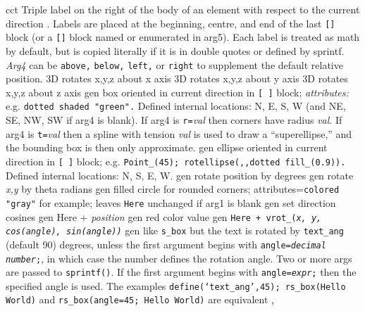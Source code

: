   {cct}%
  {Triple label on the right of the body of an element with respect to the
    current direction .  Labels are placed at the
    beginning, centre, and end of the last {\tt []} block (or a {\tt []} block
    named or enumerated in arg5). Each label is treated as math by
    default, but is copied literally if it is in double quotes or defined
    by sprintf.  {\sl Arg4} can be {\tt above,} {\tt below,} {\tt left,}
    or {\tt right} to supplement the default relative position.}%
%
  {3D} {rotates x,y,z about x axis}%
%
  {3D} {rotates x,y,z about y axis}%
%
  {3D} {rotates x,y,z about z axis}%
%
  {gen}%
  {box oriented in current direction in {\tt [ ]} block;
   {\sl attributes:} e.g. {\tt dotted shaded "green".}  Defined internal
   locations: N, E, S, W (and NE, SE, NW, SW if arg4 is blank).  If arg4
   is {\tt r=}{\sl val} then corners have radius {\sl val}.  If arg4 is
   {\tt t=}{\sl val} then a spline with tension {\sl val} is used to draw
   a ``superellipse,'' and the bounding box is then only approximate. }%
%
  {gen}%
  {ellipse oriented in current direction in {\tt [ ]} block;
   e.g. {\tt Point\_(45); rotellipse(,{},dotted fill\_(0.9)).} Defined
   internal locations: N, S, E, W.}%
%
  {gen}%
  {rotate position by degrees}%
%
  {gen}%
  {rotate {\sl x,y} by theta radians}%
%
  {gen}%
  {filled circle for rounded corners; attributes={\tt colored "gray"}
   for example; leaves {\tt Here} unchanged if arg1 is blank
    }%
%
  {gen}%
  {set direction cosines}%
%
  {gen}%
  {Here + {\sl position}}%
%
  {gen}%
  {red color value}%
%
  {gen}%
  {\tt Here + vrot\_({\sl x, y, cos(angle), sin(angle))}}%
%
  {gen}%
  {like {\tt s\_box} but the text is rotated by {\tt text\_ang}%
   (default 90) degrees, unless
   the first argument begins with {\tt angle={\sl decimal number};},
   in which case the number defines the rotation angle.
   Two or more args are passed to {\tt sprintf()}.
   If the first argument begins with {\tt angle={\sl expr};} then
   the specified angle is used.
   The examples {\tt define(`text\_ang',45); rs\_box(Hello World)} and
   {\tt rs\_box(angle=45; Hello World)} are equivalent
   , }%

